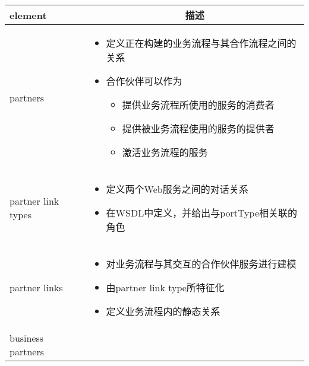 \begin{longtable}{|m{3.7cm}<{\centering}|m{11cm}|}
    \hline
    \textbf{element} & \multicolumn{1}{c|}{\textbf{描述}} \\ \hline
    partners &
    \vspace{-1.3em}
    \begin{itemize}[leftmargin=1.5em,itemsep=-2pt]
        \item 定义正在构建的业务流程与其合作流程之间的关系
        \item 合作伙伴可以作为
        \vspace{-0.2em}
        \begin{itemize}[leftmargin=1.5em,itemsep=-2pt]
            \item 提供业务流程所使用的服务的消费者
            \item 提供被业务流程使用的服务的提供者
            \item 激活业务流程的服务
        \end{itemize}
    \vspace{-1.5em}
    \end{itemize}                                           
    \\ \hline
    partner link types &
    \vspace{-1.3em}
    \begin{itemize}[leftmargin=1.5em,itemsep=-2pt]
        \item 定义两个Web服务之间的对话关系
        \item 在WSDL中定义，并给出与portType相关联的角色
    \vspace{-1.5em}
    \end{itemize}                                           
    \\ \hline
    partner links &
    \vspace{-1.3em}
    \begin{itemize}[leftmargin=1.5em,itemsep=-2pt]
        \item 对业务流程与其交互的合作伙伴服务进行建模
        \item 由partner link type所特征化
        \item 定义业务流程内的静态关系
    \vspace{-1.5em}
    \end{itemize}                                           
    \\ \hline
    business partners &
    \vspace{-1.3em}
    \begin{itemize}[leftmargin=1.5em,itemsep=-2pt]

\end{itemize}
\end{longtable}
